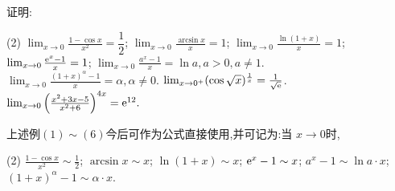 \begin{example}
    证明:
    \begin{tasks}[label=(\arabic*)](2)
        \task $\lim_{x \to 0} \frac{1 - \cos x}{x^2} = \dfrac 12$;
        \task $\lim_{x \to 0} \frac{\arcsin x}{x} = 1$;
        \task $\lim_{x \to 0} \frac{\ln(1+x)}{x} = 1$;
        \task $\lim_{x \to 0} \frac{\mathrm{e}^x - 1}{x} = 1$;
        \task $\lim_{x \to 0} \frac{a^x - 1}{x} = \ln a, a>0, a \neq 1$.
        \task $\lim_{x \to 0} \frac{(1+x)^\alpha - 1}{x} = \alpha, \alpha \neq 0$.
        \task $\lim_{x \to 0^+} (\cos \sqrt{x})^{\frac 1x} = \frac 1{\sqrt{\mathrm{e}}}$.
        \task $\lim_{x \to 0} \left(\frac{x^2 +3x- 5}{x^2+6} \right)^{4x}=\mathrm{e}^{12}. $
    \end{tasks}

    上述例$(1) \sim (6)$今后可作为公式直接使用,并可记为:当 $x \to 0 $时,
    \begin{tasks}[label=(\arabic*)](2)
        \task $\frac{1-\cos x}{x^2} \sim \frac 12$;
        \task $\arcsin x \sim x$;
        \task $\ln(1+x) \sim x$;
        \task $\mathrm{e}^x - 1 \sim x$;
        \task $a^x - 1 \sim \ln a \cdot x$;
        \task $(1+x)^\alpha - 1 \sim \alpha \cdot x$.
    \end{tasks}

\end{example}

